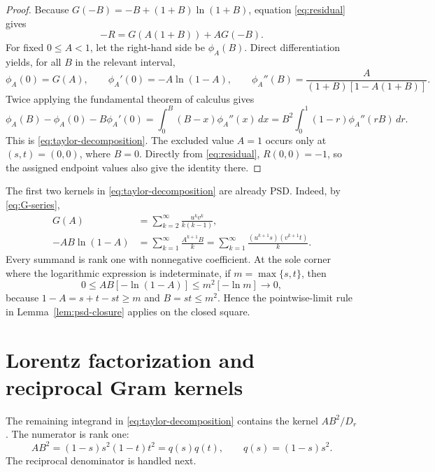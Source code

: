 \documentclass[11pt]{article}
\theoremstyle{plain}
\theoremstyle{definition}
\theoremstyle{remark}
\begin{document}
\begin{proof}
Because
\(G(-B)=-B+(1+B)\ln(1+B)\), equation \eqref{eq:residual} gives
\begin{equation}
  -R=G(A(1+B))+A G(-B).
  \label{eq:phi-definition}
\end{equation}
For fixed \(0\le A<1\), let the right-hand side be \(\phi_A(B)\).  Direct
differentiation yields, for all \(B\) in the relevant interval,
\begin{equation}
  \phi_A(0)=G(A),\qquad
  \phi_A'(0)=-A\ln(1-A),\qquad
  \phi_A''(B)=\frac{A}{(1+B)[1-A(1+B)]}.
  \label{eq:phi-derivatives}
\end{equation}
Twice applying the fundamental theorem of calculus gives
\[
  \phi_A(B)-\phi_A(0)-B\phi_A'(0)
  =\int_0^B(B-x)\phi_A''(x)\,dx
  =B^2\int_0^1(1-r)\phi_A''(rB)\,dr.
\]
This is \eqref{eq:taylor-decomposition}.  The excluded value \(A=1\) occurs
only at \((s,t)=(0,0)\), where \(B=0\).  Directly from
\eqref{eq:residual}, \(R(0,0)=-1\), so the assigned endpoint values also give
the identity there.
\end{proof}

The first two kernels in \eqref{eq:taylor-decomposition} are already PSD.
Indeed, by \eqref{eq:G-series},
\begin{align}
  G(A)&=\sum_{k=2}^{\infty}\frac{u^kv^k}{k(k-1)},
  \label{eq:first-psd-series}\\
  -AB\ln(1-A)
  &=\sum_{k=1}^{\infty}\frac{A^{k+1}B}{k}
    =\sum_{k=1}^{\infty}\frac{(u^{k+1}s)(v^{k+1}t)}{k}.
  \label{eq:second-psd-series}
\end{align}
Every summand is rank one with nonnegative coefficient.  At the sole corner
where the logarithmic expression is indeterminate, if
\(m=\max\{s,t\}\), then
\begin{equation}
  0\le AB[-\ln(1-A)]
  \le m^2[-\ln m]\longrightarrow0,
  \label{eq:log-endpoint}
\end{equation}
because \(1-A=s+t-st\ge m\) and \(B=st\le m^2\).  Hence the pointwise-limit
rule in Lemma~\ref{lem:psd-closure} applies on the closed square.

\section{Lorentz factorization and reciprocal Gram kernels}
\label{sec:lorentz}

The remaining integrand in \eqref{eq:taylor-decomposition} contains the kernel
\(AB^2/D_r\).  The numerator is rank one:
\begin{equation}
  AB^2=(1-s)s^2(1-t)t^2=q(s)q(t),
  \qquad q(s)=(1-s)s^2.
  \label{eq:numerator-rank-one}
\end{equation}
The reciprocal denominator is handled next.
\end{document}
